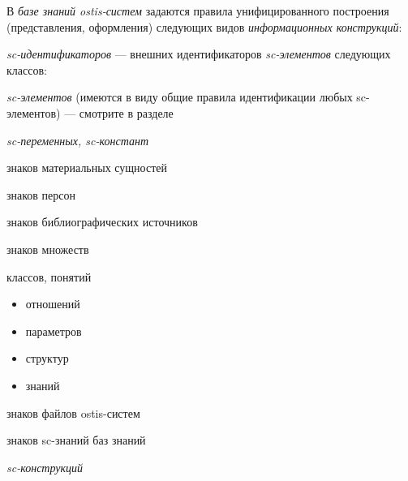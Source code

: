 \begin{SCn}
\begin{scnsubstruct}
{            В \textit{базе знаний ostis-систем} задаются правила унифицированного построения
            (представления, оформления) следующих видов \textit{информационных
                конструкций}:
            \begin{scnitemize}
                \item \textit{sc-идентификаторов} --- внешних идентификаторов
                    \textit{sc-элементов} следующих классов:
                    \begin{scnitemizeii}
                        \item \textit{sc-элементов} (имеются в виду общие правила идентификации
                                    любых sc-элементов) --- смотрите в разделе
                        \item \textit{sc-переменных, sc-констант}
                        \item знаков материальных сущностей
                            \begin{scnitemizeiii}
                                \item знаков персон
                                \item знаков библиографических источников
                            \end{scnitemizeiii}
                        \item знаков множеств
                            \begin{scnitemizeiii}
                                \item классов, понятий
                                \begin{itemize}
                                    \item отношений
                                    \item параметров
                                    \item структур
                                    \item знаний
                                \end{itemize}
                            \end{scnitemizeiii}
                        \item знаков файлов ostis-систем
                        \item знаков sc-знаний баз знаний
                    \end{scnitemizeii}
                \item \textit{sc-конструкций}

\end{scnitemize}}
\end{scnsubstruct}
\end{SCn}
